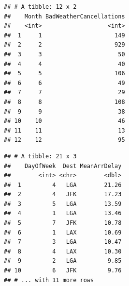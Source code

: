 \documentclass[]{book}
\newenvironment{Shaded}{\begin{snugshade}}{\end{snugshade}}
\newcommand{\KeywordTok}[1]{\textcolor[rgb]{0.13,0.29,0.53}{\textbf{#1}}}
\newcommand{\DataTypeTok}[1]{\textcolor[rgb]{0.13,0.29,0.53}{#1}}
\newcommand{\DecValTok}[1]{\textcolor[rgb]{0.00,0.00,0.81}{#1}}
\newcommand{\StringTok}[1]{\textcolor[rgb]{0.31,0.60,0.02}{#1}}
\newcommand{\CommentTok}[1]{\textcolor[rgb]{0.56,0.35,0.01}{\textit{#1}}}
\newcommand{\OperatorTok}[1]{\textcolor[rgb]{0.81,0.36,0.00}{\textbf{#1}}}
\newcommand{\NormalTok}[1]{#1}
\theoremstyle{definition}
\theoremstyle{definition}
\theoremstyle{definition}
\theoremstyle{remark}
\begin{document}
\begin{verbatim}
## # A tibble: 12 x 2
##    Month BadWeatherCancellations
##    <int>                   <int>
##  1     1                     149
##  2     2                     929
##  3     3                      50
##  4     4                      40
##  5     5                     106
##  6     6                      49
##  7     7                      29
##  8     8                     108
##  9     9                      38
## 10    10                      46
## 11    11                      13
## 12    12                      95
\end{verbatim}

\begin{Shaded}
\end{Shaded}

\begin{verbatim}
## # A tibble: 21 x 3
##    DayOfWeek  Dest MeanArrDelay
##        <int> <chr>        <dbl>
##  1         4   LGA        21.26
##  2         4   JFK        17.23
##  3         5   LGA        13.59
##  4         1   LGA        13.46
##  5         7   JFK        10.78
##  6         1   LAX        10.69
##  7         3   LGA        10.47
##  8         4   LAX        10.30
##  9         2   LGA         9.85
## 10         6   JFK         9.76
## # ... with 11 more rows
\end{verbatim}
\end{document}
